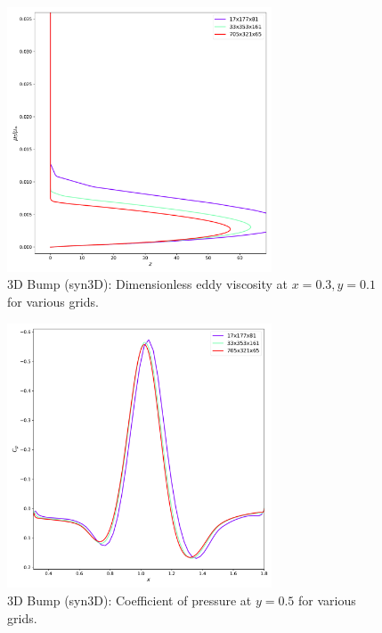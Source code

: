 \begin{figure}[ht!]
    \centering
    \includegraphics[width=0.7\textwidth]{figs/3dbump/x03y01REV_study.pdf}
    \caption{3D Bump (syn3D): Dimensionless eddy viscosity at $x=0.3,y=0.1$ for various grids.}
    \label{fig:syn3dbumpmutstudy}
\end{figure}

\begin{figure}[ht!]
    \centering
    \includegraphics[width=0.7\textwidth]{figs/3dbump/cop050study.pdf}
    \caption{3D Bump (syn3D): Coefficient of pressure at $y=0.5$ for various grids.}
    \label{fig:syn3dbumpcpstudy}
\end{figure}
